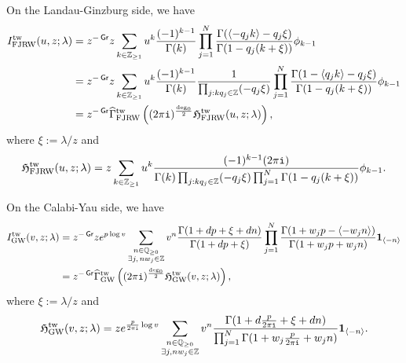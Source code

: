 \documentclass[11pt]{amsart}
\theoremstyle{definition} %
\theoremstyle{remark} %
\newtheorem{rem}[thm]{Remark}%
\newcommand{\QQ}{\mathbb Q}
\newcommand{\ZZ}{\mathbb Z}
\newcommand{\la}{\lambda}
\newcommand{\tw}{{\rm tw}}
\def\GW{\operatorname{\text{GW}}}
\def\fracp#1{\left\langle #1 \right\rangle}
\newcommand{\unit}{\boldsymbol{1}}
\newcommand{\Nar}{\operatorname{\mathsf{Nar}}}
\newcommand{\FJRW}{{\operatorname{FJRW}}}
\renewcommand{\GW}{{\operatorname{GW}}}
\newcommand{\grading}{\operatorname{\mathsf{Gr}}} %
\newcommand{\hGamma}{\widehat{\Gamma}}
\newcommand{\iu}{\mathtt{i}}
\newcommand{\Hf}{{\mathfrak{H}}}
\begin{document}
On the Landau-Ginzburg side, we have 
\begin{align*}
I_{\FJRW}^\tw (u,z;\lambda)
&=z^{-\grading} z 
\sum_{k\in \ZZ_{\ge 1}} u^k\frac{(-1)^{k-1}}{\Gamma(k)}  
\prod_{j=1}^N
\frac{\Gamma(\fracp{-q_j k}-q_j\xi)}
{\Gamma(1-q_j(k+\xi))} 
\phi_{k-1} \\
&= z^{-\grading} z 
\sum_{k\in \ZZ_{\ge 1}} u^k\frac{(-1)^{k-1}}{\Gamma(k)}  
 \frac{1}{\prod_{j: k q_j \in \ZZ}(-q_j \xi)} 
\prod_{j=1}^N\frac{\Gamma(1-\fracp{q_j k}-q_j\xi)}{ 
\Gamma(1-q_j(k+\xi)) } 
\phi_{k-1} \\
&= z^{-\grading} \hGamma^\tw_{\FJRW} 
\left( (2\pi\iu)^{\frac{\deg_0}{2}} 
\Hf_{\FJRW}^\tw (u,z;\lambda) \right),
\end{align*}
where $\xi := \lambda/z$ and 
\begin{equation}
\label{eq:HfunctRW}
\Hf_{\FJRW}^{\tw}(u,z;\lambda)=z 
\sum_{k\in \ZZ_{\ge 1}} u^k 
\frac{(-1)^{k-1} (2 \pi\iu)}
{\Gamma(k)
\prod_{j: k q_j \in \ZZ} (-q_j \xi ) 
\prod_{j=1}^N 
\Gamma(1-q_j(k+\xi))}  
\phi_{k-1}.
\end{equation}



On the Calabi-Yau side, we have 
\begin{align*}
I_{\GW}^\tw(v,z;\lambda)&=
z^{-\grading} z e^{p\log v} 
\sum_{\substack{n\in \QQ_{\ge 0}\\ 
\exists j,\, nw_j\in \ZZ}}
v^{n}
\frac{\Gamma(1+dp+\xi+dn)}{\Gamma(1+dp+\xi)}
\prod_{j=1}^N 
\frac{\Gamma(1+w_jp-\fracp{-w_j n})}{\Gamma(1+w_j p+w_j n)}
\unit_{\langle -n\rangle}\\
 &= z^{-\grading} \hGamma^\tw_{\GW} 
\left( (2\pi\iu)^{\frac{\deg_0}{2}} 
\Hf_{\GW}^\tw(v,z;\lambda)\right) ,
\end{align*}
where $\xi := \lambda/z$ and 
\begin{equation}
\label{eq:HfunctGW} 
\Hf_{\GW}^\tw(v,z;\lambda) = z e^{\frac{p}{2\pi\iu} \log v} 
\sum_{\substack{n\in \QQ_{\ge 0}\\\exists j, nw_j\in \ZZ}}
v^{n}
\frac{\Gamma(1+d\frac{p}{2\pi\iu}+\xi+dn)}
{\prod_{j=1}^N\Gamma(1+w_j\frac{p}{2\pi\iu}+w_jn)}
\unit_{\langle -n\rangle}.
\end{equation}
\end{document}
